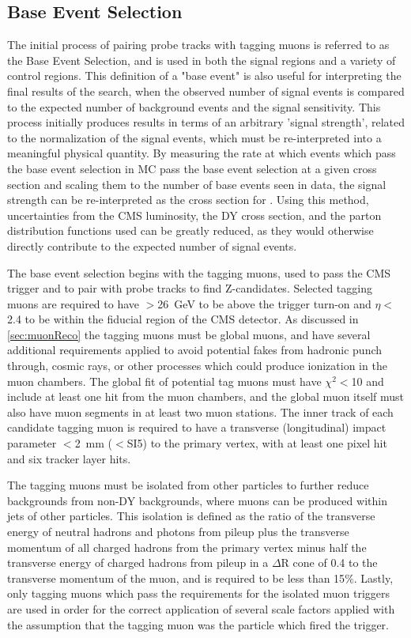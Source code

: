 \subsection{Base Event Selection}
The initial process of pairing probe tracks with tagging muons is referred to as the Base Event Selection, and is used in both the signal regions and a variety of control regions.
This definition of a "base event" is also useful for interpreting the final results of the search, when the observed number of signal events is compared to the expected number of background events and the signal sensitivity.
This process initially produces results in terms of an arbitrary 'signal strength', related to the normalization of the signal events, which must be re-interpreted into a meaningful physical quantity.
By measuring the rate at which events which pass the base event selection in MC pass the base event selection at a given cross section and scaling them to the number of base events seen in data, the signal strength can be re-interpreted as the cross section for \dbrem.
Using this method, uncertainties from the CMS luminosity, the DY cross section, and the parton distribution functions used can be greatly reduced, as they would otherwise directly contribute to the expected number of signal events.

The base event selection begins with the tagging muons, used to pass the CMS trigger and to pair with probe tracks to find Z-candidates.
Selected tagging muons are required to have \pt$>$\SI{26}{\giga\eV} to be above the trigger turn-on and $\eta<$2.4 to be within the fiducial region of the CMS detector. 
As discussed in \cref{sec:muonReco} the tagging muons must be global muons, and have several additional requirements applied to avoid potential fakes from hadronic punch through, cosmic rays, or other processes which could produce ionization in the muon chambers.
The global fit of potential tag muons must have $\chi^2<$10 and include at least one hit from the muon chambers, and the global muon itself must also have muon segments in at least two muon stations.
The inner track of each candidate tagging muon is required to have a transverse (longitudinal) impact parameter $<$\SI{2}{\milli\meter} ($<$SI{5}{\milli\meter}) to the primary vertex, with at least one pixel hit and six tracker layer hits.

The tagging muons must be isolated from other particles to further reduce backgrounds from non-DY backgrounds, where muons can be produced within jets of other particles.
This isolation is defined as the ratio of the transverse energy of neutral hadrons and photons from pileup plus the transverse momentum of all charged hadrons from the primary vertex minus half the transverse energy of charged hadrons from pileup in a $\Delta$R cone of 0.4 to the transverse momentum of the muon, and is required to be less than 15$\%$.
Lastly, only tagging muons which pass the requirements for the isolated muon triggers are used in order for the correct application of several scale factors applied with the assumption that the tagging muon was the particle which fired the trigger.

